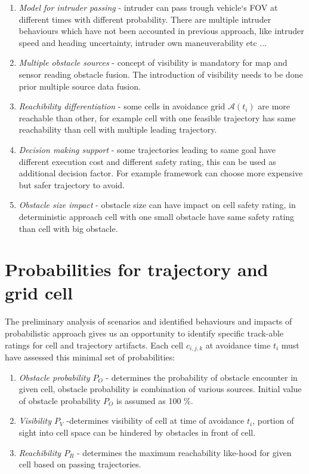 \begin{enumerate}
    \item \textit{Model for intruder passing} - intruder can pass trough vehicle`s FOV at different times with different probability. There are multiple intruder behaviours which have not been accounted in previous approach, like intruder speed and heading uncertainty, intruder own maneuverability etc ...
    \item \textit{Multiple obstacle sources} - concept of visibility is mandatory for map and sensor reading obstacle fusion. The introduction of visibility needs to be done prior multiple source data fusion.
    \item \textit{Reachibility differentiation} - some cells in avoidance grid $\mathscr{A}(t_i)$ are more reachable than other, for example cell with one feasible trajectory has same reachability than cell with multiple leading trajectory.
    \item \textit{Decision making support} - some trajectories leading to same goal have different execution cost and different safety rating, this can be used as additional decision factor. For example framework can choose more expensive but safer trajectory to avoid.
    \item \textit{Obstacle size impact} - obstacle size can have impact on cell safety rating, in deterministic approach cell with one small obstacle have same safety rating than cell with big obstacle.
\end{enumerate}

\newpage
\section{Probabilities for trajectory and grid cell}
\noindent The preliminary analysis of scenarios and identified behaviours and impacts of probabilistic approach gives us an opportunity to identify specific track-able ratings for cell and trajectory artifacts. 
Each cell $c_{i,j,k}$ at avoidance time $t_i$ must have assessed this minimal set of probabilities:
\begin{enumerate}    
    \item \textit{Obstacle probability $P_O$} - determines the probability of obstacle encounter in given cell, obstacle probability is combination of various sources. Initial value of obstacle probability $P_O$ is assumed as 100 \%.
    \item \textit{Visibility $P_V$} -determines visibility of cell at time of avoidance $t_i$, portion of sight into cell space can be hindered by obstacles in front of cell.
    \item \textit{Reachibility $P_R$} - determines the maximum reachability like-hood for given cell based on passing trajectories. 
\end{enumerate}

